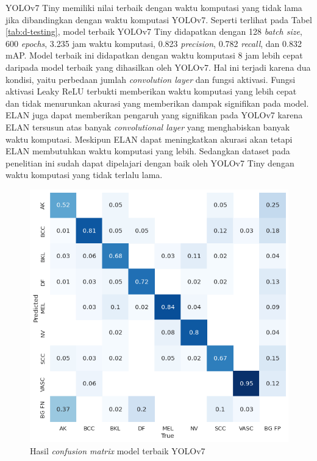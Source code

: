 YOLOv7 Tiny memiliki nilai terbaik dengan waktu komputasi yang tidak lama jika dibandingkan dengan waktu komputasi YOLOv7. Seperti terlihat pada Tabel \ref{tab:d-testing}, model terbaik YOLOv7 Tiny didapatkan dengan 128 \textit{batch size}, 600 \textit{epochs}, 3.235 jam waktu komputasi, 0.823 \textit{precision}, 0.782 \textit{recall}, dan 0.832 mAP. Model terbaik ini didapatkan dengan waktu komputasi 8 jam lebih cepat daripada model terbaik yang dihasilkan oleh YOLOv7. Hal ini terjadi karena dua kondisi, yaitu perbedaan jumlah \textit{convolution layer} dan fungsi aktivasi. Fungsi aktivasi Leaky ReLU terbukti memberikan waktu komputasi yang lebih cepat dan tidak menurunkan akurasi yang memberikan dampak signifikan pada model. ELAN juga dapat memberikan pengaruh yang signifikan pada YOLOv7 karena ELAN tersusun atas banyak \textit{convolutional layer} yang menghabiskan banyak waktu komputasi. Meskipun ELAN dapat meningkatkan akurasi akan tetapi ELAN membutuhkan waktu komputasi yang lebih. Sedangkan dataset pada penelitian ini sudah dapat dipelajari dengan baik oleh YOLOv7 Tiny dengan waktu komputasi yang tidak terlalu lama.

\begin{figure}[H]
    \begin{center}
        \includegraphics[width=12cm]{img/bab4/confmat-yolov7.png}
        \caption{Hasil \textit{confusion matrix} model terbaik YOLOv7}
        \label{fig:d-confmat-yolov7}
    \end{center}
\end{figure}

